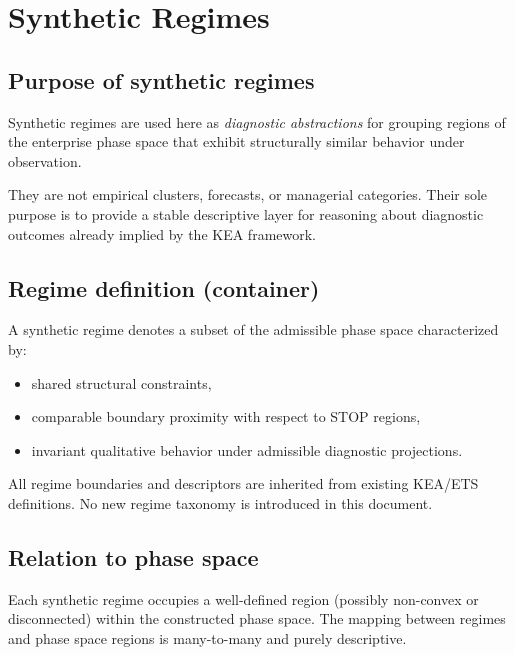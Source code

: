 
\section{Synthetic Regimes}
\label{sec:synthetic-regimes}

\subsection{Purpose of synthetic regimes}
Synthetic regimes are used here as \emph{diagnostic abstractions} for grouping
regions of the enterprise phase space that exhibit structurally similar behavior
under observation.

They are not empirical clusters, forecasts, or managerial categories.
Their sole purpose is to provide a stable descriptive layer for reasoning about
diagnostic outcomes already implied by the KEA framework.

\subsection{Regime definition (container)}
A synthetic regime denotes a subset of the admissible phase space characterized by:
\begin{itemize}
  \item shared structural constraints,
  \item comparable boundary proximity with respect to STOP regions,
  \item invariant qualitative behavior under admissible diagnostic projections.
\end{itemize}

All regime boundaries and descriptors are inherited from existing KEA/ETS definitions.
No new regime taxonomy is introduced in this document.

\subsection{Relation to phase space}
Each synthetic regime occupies a well-defined region (possibly non-convex or
disconnected) within the constructed phase space.
The mapping between regimes and phase space regions is many-to-many and purely
descriptive.

